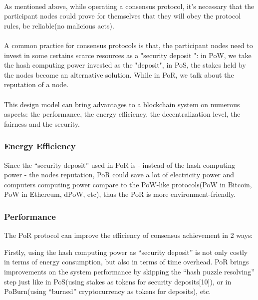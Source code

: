 \documentclass[doublespacing]{bmcart}
\begin{document}
\begin{CJK*}{UTF8}{gbsn}
\paragraph{} As mentioned above, while operating a consensus protocol, it's necessary that the participant nodes could prove for themselves that they will obey the protocol rules, be reliable(no malicious acts).
\paragraph{}
A common practice for consensus protocols is that, the participant nodes need to invest in some certains scarce resources as a "security deposit
": in PoW, we take the hash computing power invested as the "deposit", in PoS, the stakes held by the nodes become an alternative solution. While in PoR, we talk about the reputation of a node.
\paragraph{}
This design model can bring advantages to a blockchain system on numerous aspects: the performance, the energy efficiency, the decentralization level, the fairness and the security.
\subsubsection*{Energy Efficiency}
Since the ``security deposit'' used in PoR is - instead of the hash computing power - the nodes reputation, PoR could save a lot of electricity power and computers computing power compare to the PoW-like protocols(PoW in Bitcoin, PoW in Ethereum, dPoW, etc), thus the PoR is more environment-friendly.  
\subsubsection*{Performance}
The PoR protocol can improve the efficiency of consensus achievement in 2 ways:
\par Firstly, using the hash computing power as ``security deposit'' is not only costly in terms of energy consumption, but also in terms of time overhead. PoR brings improvements on the system performance by skipping the ``hash puzzle resolving'' step just like in PoS(using stakes as tokens for security deposits[10]), or in PoBurn(using ``burned'' cryptocurrency as tokens for deposits), etc.

\end{CJK*}
\end{document}
